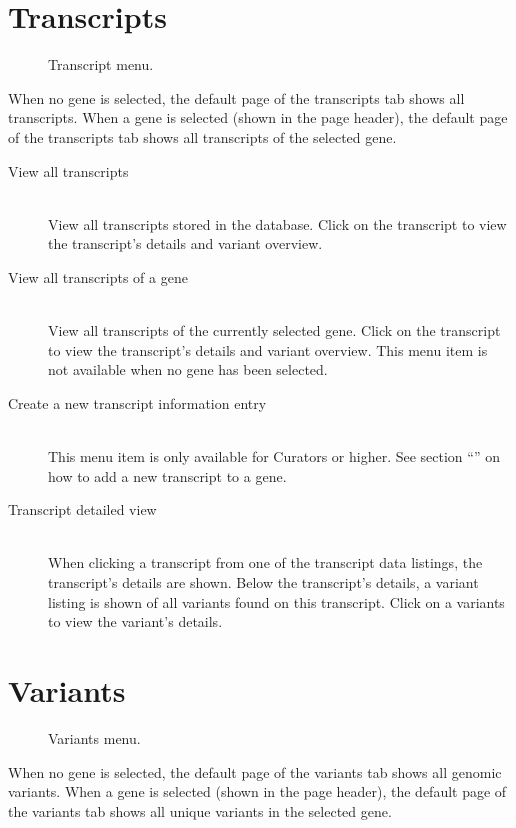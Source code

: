\section{Transcripts}
\begin{wrapfigure}[5]{l}{7cm} %
  \vspace{-25pt}
  \begin{shaded}
    \centering
    \caption{Transcript menu.}
  \end{shaded}
\end{wrapfigure}
When no gene is selected, the default page of the transcripts tab shows all transcripts.
When a gene is selected (shown in the page header),
 the default page of the transcripts tab shows all transcripts of the selected gene.
\clearpage

\begin{description}
  \item [View all transcripts] \hfill \\
  View all transcripts stored in the database.
  Click on the transcript to view the transcript's details and variant overview.
  \item [View all transcripts of a gene] \hfill \\
  View all transcripts of the currently selected gene.
  Click on the transcript to view the transcript's details and variant overview.
  This menu item is not available when no gene has been selected.
  \item [Create a new transcript information entry] \hfill \\
  This menu item is only available for Curators or higher.
  See section ``'' on how to add a new transcript to a gene.
  \item [Transcript detailed view] \hfill \\
  When clicking a transcript from one of the transcript data listings, the transcript's details are shown.
  Below the transcript's details, a variant listing is shown of all variants found on this transcript.
  Click on a variants to view the variant's details.
\end{description}





\section{Variants}
\begin{wrapfigure}[16]{r}{7cm}
  \vspace{-25pt}
  \begin{shaded}
    \centering
    \caption{Variants menu.}
  \end{shaded}
\end{wrapfigure}
When no gene is selected, the default page of the variants tab shows all genomic variants.
When a gene is selected (shown in the page header),
 the default page of the variants tab shows all unique variants in the selected gene.

